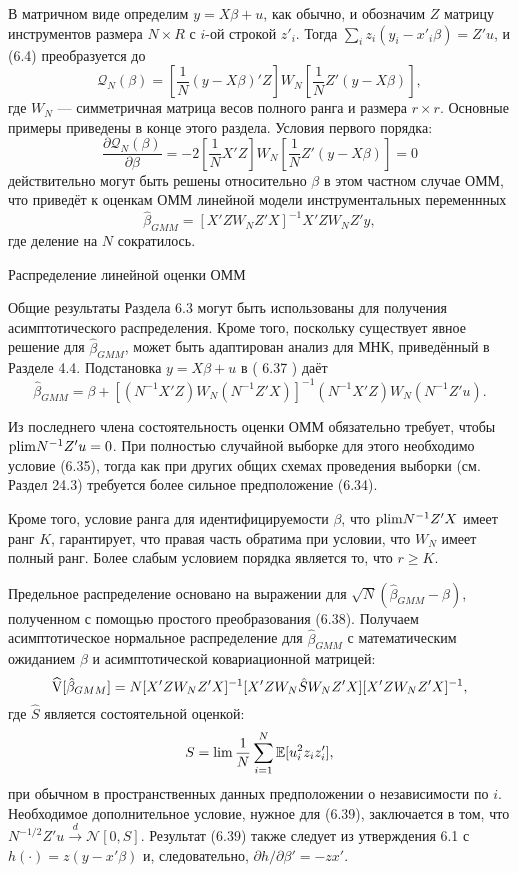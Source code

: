 В матричном виде определим $y=X \beta+u$, как обычно, и обозначим $Z$ матрицу инструментов размера $N \times R$ с $i$-ой строкой $z'_i$. Тогда $\sum_i z_i(y_i-x'_i\beta)=Z'u$, и (6.4) преобразуется до
\begin{equation}
\mathcal{Q}_{N}(\beta)= \left[ \frac{1}{N} (y-X\beta)'Z \right] W_N \left[ \frac{1}{N} Z'(y-X\beta) \right],
\end{equation}
где $W_N$ --- симметричная матрица весов полного ранга и размера $r \times r$. Основные примеры приведены в конце этого раздела. Условия первого порядка:
\[
\frac{\partial \mathcal{Q}_{N}(\beta)}{\partial \beta}=-2 \left[ \frac{1}{N} X'Z \right] W_N \left[ \frac{1}{N} Z'(y-X \beta) \right]=0
\] 
действительно могут быть решены относительно $\beta$ в этом частном случае ОММ, что приведёт к оценкам ОММ линейной модели инструментальных переменнных
\begin{equation}
\hat{\beta}_{GMM}=[X' Z W_N Z' X]^{-1} X' Z W_N Z' y,
\end{equation}
где деление на $N$ сократилось.

\begin{center}
Распределение линейной оценки ОММ
\end{center}

Общие результаты Раздела 6.3 могут быть использованы для получения асимптотического распределения. Кроме того, поскольку существует явное решение для $\hat{\beta}_{GMM}$, может быть адаптирован анализ для МНК, приведённый в Разделе 4.4. Подстановка $y=X\beta+u$ в ( 6.37 ) даёт
\begin{equation}
\hat{\beta}_{GMM}=\beta+[(N^{-1}X'Z) W_N (N^{-1}Z'X)]^{-1} (N^{-1}X'Z) W_N (N^{-1}Z'u).
\end{equation}

Из последнего члена состоятельность оценки ОММ обязательно требует, чтобы $\mathrm{plim } N^{-1}Z'u=0$. При полностью случайной выборке для этого необходимо условие (6.35), тогда как при других общих схемах проведения выборки (см. Раздел 24.3) требуется более сильное предположение (6.34).

Кроме того, условие ранга для идентифицируемости $\beta$, что $\mathrm{plim } N^{-1}Z'X$ имеет ранг $K$, гарантирует, что правая часть обратима при условии, что $W_N$ имеет полный ранг. Более слабым условием порядка является то, что $r \ge K$.

Предельное распределение основано на выражении для $\sqrt{N} (\hat{\beta}_{GMM}-\beta)$, полученном с помощью простого преобразования (6.38). Получаем асимптотическое нормальное распределение для $\hat{\beta}_{GMM}$ с математическим ожиданием $\beta$ и асимптотической ковариационной матрицей:
\begin{equation}
\widehat{\mathrm{V}}[\hat{\beta}_{GMM}]=N[X' Z W_N Z'X]^{-1}[X' Z W_N \hat{S} W_N Z'X] [X' Z W_N Z'X]^{-1},
\end{equation}
где $\hat{S}$ является состоятельной оценкой:
\[
S= \lim \frac{1}{N} \sum_{i=1}^{N} \mathbb{E}[u^2_i z_i z'_i],
\]
при обычном в пространственных данных предположении о независимости по $i$. Необходимое дополнительное условие, нужное для (6.39), заключается в том, что $N^{-1/2}Z'u \xrightarrow{d} \mathcal{N}[0,S]$. Результат (6.39) также следует из утверждения 6.1 с $h(\cdot)=z(y-x'\beta)$ и, следовательно, $\partial h / \partial \beta'=-zx'$.

